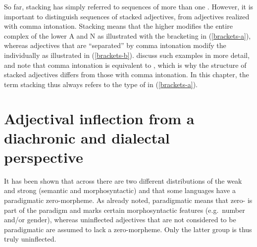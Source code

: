 \documentclass[output=paper,colorlinks,citecolor=brown]{langscibook}
\begin{document}
So far, stacking has simply referred to sequences of more than one  . However, it is important to distinguish sequences of stacked adjectives, from  adjectives realized with comma intonation. Stacking means that the higher  modifies the entire complex of the lower A and N as illustrated with the bracketing in (\ref{brackets-a}), whereas adjectives that are ``separated'' by comma intonation modify the  individually as illustrated in (\ref{brackets-b}). \citet[1992--1994]{ZifonunStrecker1997} discuss such examples in more detail, and note that comma intonation is equivalent to , which is why the structure of stacked adjectives differs from those with comma intonation. In this chapter, the term stacking thus always refers to the type of  in (\ref{brackets-a}).

\ea 
{}
\z
\z

\section{Adjectival inflection from a diachronic and dialectal perspective}\label{sect:adj-dia}

It has been shown that across  there are two different distributions of the weak and strong  (semantic and morphosyntactic) and that some languages have a paradigmatic zero-morpheme. As already noted, paradigmatic means that zero- is part of the paradigm and marks certain morphosyntactic features (e.g.~number and/or gender), whereas uninflected adjectives that are not considered to be paradigmatic are assumed to lack a zero-morpheme. Only the latter group is thus truly uninflected.
\end{document}
